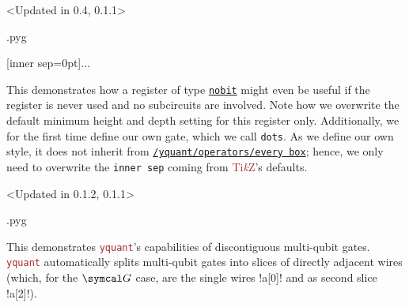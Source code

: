 \documentclass{scrartcl}
\makeatletter
\newenvironment{codeexample}{%
   \VerbatimEnvironment%
   \let\FVB@VerbatimOut\minted@FVB@VerbatimOut
   \let\FVE@VerbatimOut\minted@FVE@VerbatimOut
   \minted@configlang{tex}%
   \minted@fvset
   \begin{VerbatimOut}[codes={\catcode`\^^I=12},firstline,lastline]{\minted@jobname.pyg}%
}{
   \end{VerbatimOut}%
   \minted@langlinenoson%
   \savebox\codeexamplebox{ \minted@jobname.pyg}%
   \ifdim\wd\codeexamplebox>\dimexpr.5\linewidth-3mm\relax%
      \wd\codeexamplebox=.5\linewidth%
   \else%
      \wd\codeexamplebox=\dimexpr\wd\codeexamplebox+3mm\relax%
   \fi%
   \noindent\begin{minipage}{\wd\codeexamplebox}%
      \centering%
      \usebox\codeexamplebox%
   \end{minipage}%
   \begin{minipage}{\dimexpr\linewidth-\wd\codeexamplebox\relax}%
      \expandafter\minted@pygmentize\expandafter{\minted@lang}%
   \end{minipage}%
   \minted@langlinenosoff%
   \par%
}
\def\TikZ{\textcolor{brown}{Ti\textit kZ}}
\def\pkg#1{\textcolor{brown}{\texttt{#1}}}
\def\gate#1{\hyperref[gate:#1]{\texttt{#1}}}
\def\style#1{\hyperref[style:#1]{\texttt{#1}}}
\def\Yquant{\pkg{yquant}}
\makeatother
\begin{document}
               \begin{example}<Updated in 0.4, 0.1.1>
                  \begin{codeexample}
[inner sep=0pt]{$\dots$}
                  \end{codeexample}
                  This demonstrates how a register of type \gate{nobit} might even be useful if the register is never used and no subcircuits are involved.
                  Note how we overwrite the default minimum height and depth setting for this register only.
                  Additionally, we for the first time define our own gate, which we call \texttt{dots}.
                  As we define our own style, it does not inherit from \style{/yquant/operators/every box}; hence, we only need to overwrite the \texttt{inner sep} coming from \TikZ's defaults.
               \end{example}

               \clearpage
               \begin{example}<Updated in 0.1.2, 0.1.1>
                  \begin{codeexample}
                  \end{codeexample}
                  This demonstrates \Yquant's capabilities of discontiguous multi\hyp qubit gates.
                  \Yquant{} automatically splits multi\hyp qubit gates into slices of directly adjacent wires (which, for the $\symcal G$ case, are the single wires \yquant!a[0]! and as second slice \yquant!a[2]!).
               \end{example}
\end{document}
